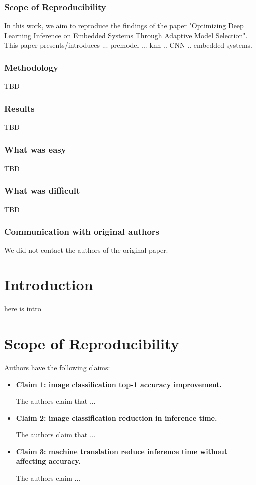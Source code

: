 \subsubsection{Scope of Reproducibility}
In this work, we aim to reproduce the findings of the paper "Optimizing Deep Learning Inference on Embedded Systems Through Adaptive Model Selection"\supercite{marco2019optimizing}. This paper presents/introduces ... premodel ... knn .. CNN .. embedded systems.

\subsubsection{Methodology}
TBD

\subsubsection{Results}
TBD

\subsubsection{What was easy}
TBD

\subsubsection{What was difficult}
TBD

\subsubsection{Communication with original authors}
We did not contact the authors of the original paper.



\section{Introduction}
here is intro

\section{Scope of Reproducibility}
Authors have the following claims:
\begin{itemize}
    \item \textbf{Claim 1: image classification top-1 accuracy improvement.}

          The authors claim that ...

    \item \textbf{Claim 2: image classification reduction in inference time.}

          The authors claim that ...

    \item \textbf{Claim 3: machine translation reduce inference time without affecting accuracy.}

          The authors claim ...

\end{itemize}


